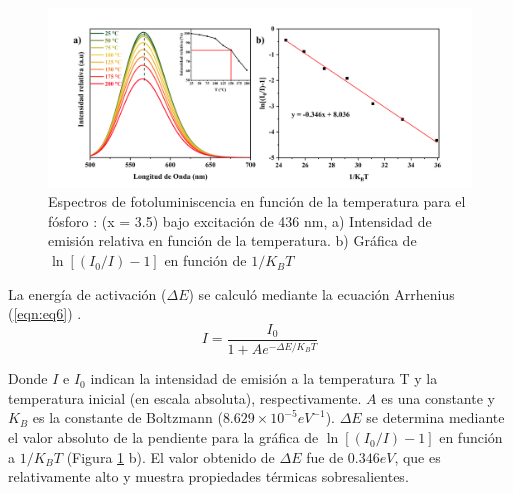 \begin{figure}[h]
    \centering%

    \includegraphics[width=\textwidth]{Kap4/fotoTemperatura.png}%
    \caption{Espectros de fotoluminiscencia en función de la temperatura para
    el fósforo : (x = 3.5) bajo
    excitación
    de 436 nm, a) Intensidad de emisión relativa en función de la temperatura.
    b)
    Gráfica de $\ln[(I_{0}/I)-1]$ en función de $1/K_BT$}\label{fig:fotoTemp}
\end{figure}

La energía de activación ($\Delta E$) se calculó mediante la ecuación Arrhenius
(\ref{eqn:eq6}) \cite{Chen2015}.\\

\begin{equation}
    I=\frac{I_0}{1+A e^{-\Delta E/K_BT}}
    \label{eqn:eq6}
\end{equation}

Donde $I$ e $I_0$ indican la intensidad de emisión a la temperatura T y la
temperatura inicial (en escala absoluta), respectivamente. $A$ es una constante
y
$K_B$ es la constante de Boltzmann ($8.629×10^{-5} eV^{-1}$). $\Delta E$ se
determina mediante el
valor absoluto de la pendiente para la gráfica de $\ln [(I_0/I)-1] $ en función
a $1/K_{B}T$ (Figura \ref{fig:fotoTemp} b). El valor obtenido de $\Delta E$ fue
de $0.346 eV$, que es relativamente
alto y
muestra propiedades térmicas sobresalientes.\\